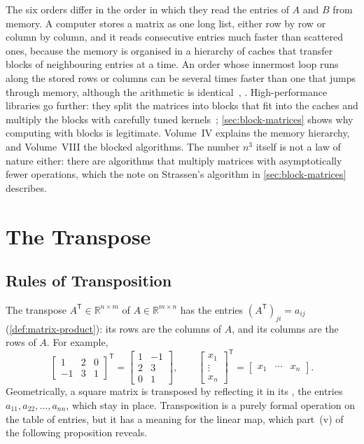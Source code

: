 The six orders differ in the order in which they read the entries of $A$ and $B$ from memory. A computer stores a matrix as one long list, either row by row or column by column, and it reads consecutive entries much faster than scattered ones, because the memory is organised in a hierarchy of caches that transfer blocks of neighbouring entries at a time. An order whose innermost loop runs along the stored rows or columns can be several times faster than one that jumps through memory, although the arithmetic is identical~\cite{dongarra1984}, \cite[Sect.~1.1]{golub2013}. High-performance libraries go further: they split the matrices into blocks that fit into the caches and multiply the blocks with carefully tuned kernels~\cite{goto2008}; \cref{sec:block-matrices} shows why computing with blocks is legitimate. Volume~IV explains the memory hierarchy, and Volume~VIII the blocked algorithms. The number $n^3$ itself is not a law of nature either: there are algorithms that multiply matrices with asymptotically fewer operations, which the note on Strassen's algorithm in \cref{sec:block-matrices} describes.

\section{The Transpose}
\label{sec:transpose}

\subsection{Rules of Transposition}

The transpose $A^{\mathsf T}\in\mathbb R^{n\times m}$ of $A\in\mathbb R^{m\times n}$ has the entries $(A^{\mathsf T})_{ji}=a_{ij}$ (\cref{def:matrix-product}): its rows are the columns of $A$, and its columns are the rows of $A$. For example,
\[
\begin{bmatrix}1&2&0\\-1&3&1\end{bmatrix}^{\mathsf T}=\begin{bmatrix}1&-1\\2&3\\0&1\end{bmatrix},\qquad\begin{bmatrix}x_1\\\vdots\\x_n\end{bmatrix}^{\mathsf T}=\begin{bmatrix}x_1&\cdots&x_n\end{bmatrix}.
\]
Geometrically, a square matrix is transposed by reflecting it in its , the entries $a_{11},a_{22},\ldots,a_{nn}$, which stay in place. Transposition is a purely formal operation on the table of entries, but it has a meaning for the linear map, which part~(v) of the following proposition reveals.

